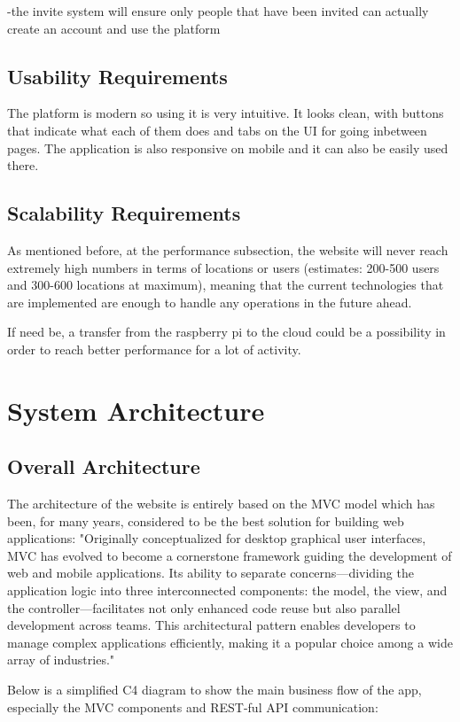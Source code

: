 \documentclass[12pt,a4paper]{report}
\begin{document}
-the invite system will ensure only people that have been invited can actually create an account and use the platform

\subsection{Usability Requirements}
The platform is modern so using it is very intuitive. It looks clean, with buttons that indicate what each of them does and tabs on the UI for going inbetween pages. The application is also responsive on mobile and it can also be easily used there.

\subsection{Scalability Requirements}
As mentioned before, at the performance subsection, the website will never reach extremely high numbers in terms of locations or users (estimates: 200-500 users and 300-600 locations at maximum), meaning that the current technologies that are implemented are enough to handle any operations in the future ahead.

If need be, a transfer from the raspberry pi to the cloud could be a possibility in order to reach better performance for a lot of activity.

\section{System Architecture}
\subsection{Overall Architecture}
The architecture of the website is entirely based on the MVC model which has been, for many years, considered to be the best solution for building web applications: "Originally conceptualized for desktop graphical user interfaces, MVC has evolved to become a cornerstone framework guiding the  development  of  web  and  mobile  applications.  Its  ability  to  separate  concerns—dividing  the application logic into three  interconnected  components:  the model, the view, and the  controller—facilitates  not  only  enhanced  code  reuse  but  also  parallel  development  across  teams.  This architectural  pattern  enables developers  to  manage complex  applications  efficiently, making  it  a popular choice among a wide array of industries."~\cite{mvcThesis}

Below is a simplified C4 diagram to show the main business flow of the app, especially the MVC components and REST-ful API communication:
\end{document}
